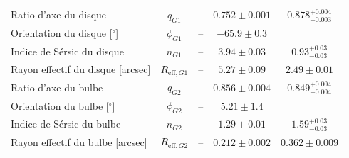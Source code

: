 \documentclass[times,10pt,twocolumn]{article}
\begin{document}
\begin{table}[hb]
\begin{tabular}{lcccc}
Ratio d'axe du disque & 
        $q_{G1}$ &
          --      & 
        $0.752 \pm 0.001$ & 
        $0.878^{+0.004}_{-0.003}$ \\[1ex]
Orientation du disque [$^{\circ}$] & 
        $\phi_{G1}$ &
          --      & 
        $-65.9 \pm 0.3$ & \\[1ex]
Indice de Sérsic du disque & 
        $n_{G1}$ &
            --    & 
        $3.94 \pm 0.03$ & 
        $0.93^{+0.03}_{-0.03}$ \\[1ex]
Rayon effectif du disque [arcsec] & 
        $R_{\mathrm{eff}, G1}$ &
              --                & 
        $5.27 \pm 0.09$ & 
        $2.49 \pm 0.01$ \\[1ex]
Ratio d'axe du bulbe & 
        $q_{G2}$ &
          --      &
        $0.856 \pm 0.004$ & 
        $0.849^{+0.004}_{-0.004}$ \\[1ex]
Orientation du bulbe [$^{\circ}$]& $\phi_{G2}$& 
           --     &
        $5.21 \pm1.4$ &
        \\[1ex]
Indice de Sérsic du bulbe & 
        $n_{G2}$ &
            --    & 
        $1.29 \pm 0.01$ & 
        $1.59^{+0.03}_{-0.03}$ \\[1ex]
Rayon effectif du bulbe [arcsec] & 
        $R_{\mathrm{eff}, G2}$ &
              --          & 
        $0.212 \pm 0.002$  & 
        $0.362 \pm 0.009$ \\[1ex]


\end{tabular}
\end{table}
\end{document}

